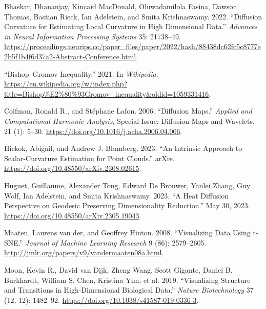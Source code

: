 \documentclass[
  letterpaper,
  DIV=11,
  numbers=noendperiod]{scrartcl}
\newlength{\cslhangindent}
\newenvironment{CSLReferences}[2] %
 {\begin{list}{}{%
  \setlength{\itemindent}{0pt}
  \setlength{\leftmargin}{0pt}
  \setlength{\parsep}{0pt}
  \ifodd #1
   \setlength{\leftmargin}{\cslhangindent}
   \setlength{\itemindent}{-1\cslhangindent}
  \fi
  \setlength{\itemsep}{#2\baselineskip}}}
 {\end{list}}
\theoremstyle{plain}
\theoremstyle{plain}
\theoremstyle{definition}
\theoremstyle{plain}
\theoremstyle{definition}
\theoremstyle{remark}
\begin{document}
\label{refs}
\begin{CSLReferences}{1}{0}
Bhaskar, Dhananjay, Kincaid MacDonald, Oluwadamilola Fasina, Dawson
Thomas, Bastian Rieck, Ian Adelstein, and Smita Krishnaswamy. 2022.
{``Diffusion Curvature for Estimating Local Curvature in High
Dimensional Data.''} \emph{Advances in Neural Information Processing
Systems} 35: 21738--49.
\url{https://proceedings.neurips.cc/paper_files/paper/2022/hash/88438dc62fc5c8777e2b5f1b4f6d37a2-Abstract-Conference.html}.

{``Bishop--{Gromov} Inequality.''} 2021. In \emph{Wikipedia}.
\url{https://en.wikipedia.org/w/index.php?title=Bishop\%E2\%80\%93Gromov_inequality&oldid=1059331416}.

Coifman, Ronald R., and Stéphane Lafon. 2006. {``Diffusion Maps.''}
\emph{Applied and Computational Harmonic Analysis}, Special {Issue}:
{Diffusion Maps} and {Wavelets}, 21 (1): 5--30.
\url{https://doi.org/10.1016/j.acha.2006.04.006}.

Hickok, Abigail, and Andrew J. Blumberg. 2023. {``An {Intrinsic
Approach} to {Scalar-Curvature Estimation} for {Point Clouds}.''} arXiv.
\url{https://doi.org/10.48550/arXiv.2308.02615}.

Huguet, Guillaume, Alexander Tong, Edward De Brouwer, Yanlei Zhang, Guy
Wolf, Ian Adelstein, and Smita Krishnaswamy. 2023. {``A {Heat Diffusion
Perspective} on {Geodesic Preserving Dimensionality Reduction}.''} May
30, 2023. \url{https://doi.org/10.48550/arXiv.2305.19043}.

Maaten, Laurens van der, and Geoffrey Hinton. 2008. {``Visualizing
{Data} Using t-{SNE}.''} \emph{Journal of Machine Learning Research} 9
(86): 2579--2605. \url{http://jmlr.org/papers/v9/vandermaaten08a.html}.

Moon, Kevin R., David van Dijk, Zheng Wang, Scott Gigante, Daniel B.
Burkhardt, William S. Chen, Kristina Yim, et al. 2019. {``Visualizing
Structure and Transitions in High-Dimensional Biological Data.''}
\emph{Nature Biotechnology} 37 (12, 12): 1482--92.
\url{https://doi.org/10.1038/s41587-019-0336-3}.


\end{CSLReferences}
\end{document}
